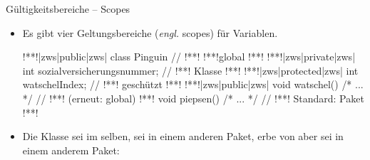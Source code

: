 \begin{frame}[fragile]{Gültigkeitsbereiche -- Scopes}
    \begin{itemize}[<+(1)->]
        \item Es gibt vier Geltungsbereiche (\textit{engl.} scopes) für Variablen.
\begin{plainjava}[language=xJava]
!**!|zws|public|zws| class Pinguin { // !**! !**!global
!**!    !**!|zws|private|zws| int sozialversicherungsnummer; // !**! Klasse
!**!    !**!|zws|protected|zws| int watschelIndex; // !**! geschützt
!**!    !**!|zws|public|zws| void watschel() { /* ... */ } // !**! (erneut: global)
!**!    void piepsen() { /* ... */ } // !**! Standard: Paket
!**!}
\end{plainjava}
    \item<8-> Die Klasse  sei im selben,  sei in einem anderen Paket,  erbe von  aber sei in einem anderem Paket: \medskip\par
    \end{itemize}
\end{frame}


